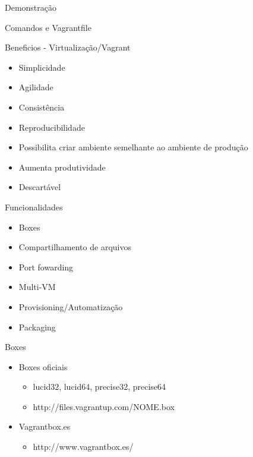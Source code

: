 \documentclass{beamer}
\begin{document}
\begin{frame}[plain,c]
  \begin{center}
    \Huge Demonstração
  \end{center}
  \begin{center}
    Comandos e Vagrantfile
  \end{center}
\end{frame}

\begin{frame}{Beneficios - Virtualização/Vagrant}
  \begin{itemize}
    \item Simplicidade
    \item Agilidade
    \item Consistência
    \item Reproducibilidade
    \item Possibilita criar ambiente semelhante ao ambiente de produção
    \item Aumenta produtividade
    \item Descartável
  \end{itemize}
\end{frame}

\begin{frame}{Funcionalidades}
  \begin{itemize}
    \item Boxes
    \item Compartilhamento de arquivos
    \item Port fowarding
    \item Multi-VM
    \item Provisioning/Automatização
    \item Packaging
  \end{itemize}
\end{frame}

\begin{frame}{Boxes}
  \begin{itemize}
    \item Boxes oficiais
    \begin{itemize}
      \item lucid32, lucid64, precise32, precise64
      \item http://files.vagrantup.com/NOME.box
    \end{itemize}
    \item Vagrantbox.es
    \begin{itemize}
      \item http://www.vagrantbox.es/
    \end{itemize}
  \end{itemize}
\end{frame}
\end{document}
